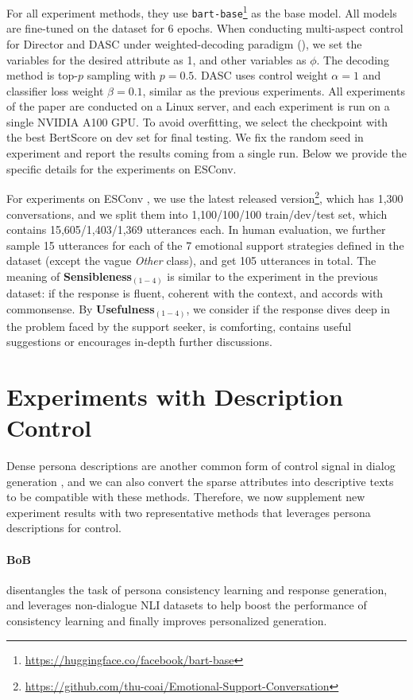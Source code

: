 For all experiment methods, they use \texttt{bart-base}\footnote{\url{https://huggingface.co/facebook/bart-base}} as the base model. All models are fine-tuned on the dataset for 6 epochs. When conducting multi-aspect control for Director and DASC under weighted-decoding paradigm (), we set the variables for the desired attribute as 1, and other variables as $\phi$. The decoding method is top-$p$ sampling with $p=0.5$. DASC uses control weight $\alpha=1$ and classifier loss weight $\beta=0.1$, similar as the previous experiments. All experiments of the paper are conducted on a Linux server, and each experiment is run on a single NVIDIA A100 GPU. To avoid overfitting, we select the checkpoint with the best BertScore on dev set for final testing. We fix the random seed in experiment and report the results coming from a single run. Below we provide the specific details for the experiments on ESConv.

For experiments on ESConv \citep{liu2021towards}, we use the latest released version\footnote{\url{https://github.com/thu-coai/Emotional-Support-Conversation}}, which has 1,300 conversations, and we split them into 1,100/100/100 train/dev/test set, which contains 15,605/1,403/1,369 utterances each. In human evaluation, we further sample 15 utterances for each of the 7 emotional support strategies defined in the dataset (except the vague \textit{Other} class), and get 105 utterances in total. The meaning of \textbf{Sensibleness}$_{(1-4)}$ is similar to the experiment in the previous dataset: if the response is fluent, coherent with the context, and accords with commonsense. By \textbf{Usefulness}$_{(1-4)}$, we consider if the response dives deep in the problem faced by the support seeker, is comforting, contains useful suggestions or encourages in-depth further discussions. 

\section{Experiments with Description Control}
\label{sec:desc_control}

Dense persona descriptions are another common form of control signal in dialog generation \citep{zhang2018personalizing}, and we can also convert the sparse attributes into descriptive texts to be compatible with these methods. Therefore, we now supplement new experiment results with two representative methods that leverages persona descriptions for control.

\paragraph{BoB} \citep{song2021bob} disentangles the task of persona consistency learning and response generation, and leverages non-dialogue NLI datasets to help boost the performance of consistency learning and finally improves personalized generation. 

